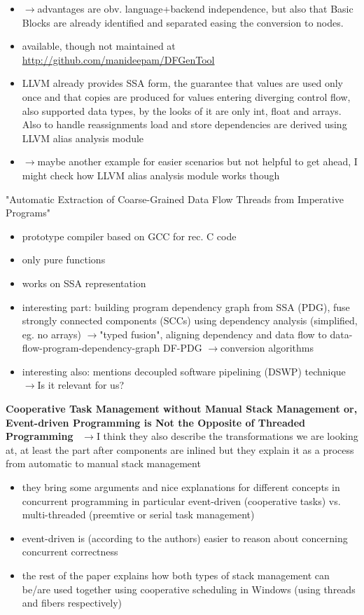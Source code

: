 \documentclass{scrartcl}
\newcommand{\means}{$\rightarrow{}$}
\begin{document}
\begin{itemize}
    \item 
\means advantages are obv. language+backend independence, but also that Basic Blocks are already identified and separated easing the conversion to nodes.
    \item available, though not maintained at \url{http://github.com/manideepam/DFGenTool}
    \item LLVM already provides SSA form, the guarantee that values are used only once and that copies are produced for values entering diverging control flow, also supported data types, by the looks of it are only int, float and arrays. Also to handle reassignments load and store dependencies are derived using LLVM alias analysis module
    \item \means maybe another example for easier scenarios but not helpful to get ahead, I might check how LLVM alias analysis module works though
\end{itemize}

"Automatic Extraction of Coarse-Grained Data Flow Threads from Imperative Programs" 
\begin{itemize}
    \item prototype compiler based on GCC for rec. C code
    \item only pure functions
    \item works on SSA representation
    \item interesting part: building program dependency graph from SSA (PDG), fuse strongly connected components (SCCs) using dependency analysis (simplified, eg. no arrays) \means "typed fusion", aligning dependency and data flow to data-flow-program-dependency-graph DF-PDG \means conversion algorithms     
    \item interesting also: mentions decoupled software pipelining (DSWP) technique \means Is it relevant for us?
\end{itemize}


\textbf{Cooperative Task Management without Manual Stack Management
or, Event-driven Programming is Not the Opposite of Threaded Programming}~\cite{adya2002cooperative}
\means I think they also describe the transformations we are looking at, at least the part after components are inlined  but they explain it as a process from automatic to manual stack management
\begin{itemize}
    \item they bring some arguments and nice explanations for different concepts in
    concurrent programming in particular event-driven (cooperative tasks) vs. multi-threaded (preemtive or serial task management)
    \item event-driven is (according to the authors) easier to reason about concerning concurrent correctness
    \item the rest of the paper explains how both types of stack management can be/are used together using cooperative scheduling in Windows (using threads and fibers respectively)
\end{itemize}
\end{document}

